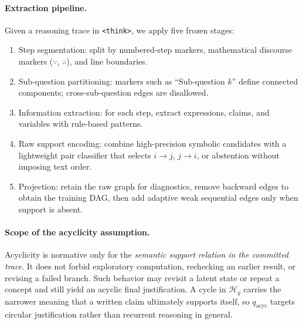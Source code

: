 \paragraph{Extraction pipeline.}
Given a reasoning trace in \texttt{<think>}, we apply five frozen stages:
\begin{enumerate}[leftmargin=*,itemsep=1pt]
    \item Step segmentation: split by numbered-step markers, mathematical discourse markers ($\because$, $\therefore$), and line boundaries.
    \item Sub-question partitioning: markers such as ``Sub-question $k$'' define connected components; cross-sub-question edges are disallowed.
    \item Information extraction: for each step, extract expressions, claims, and variables with rule-based patterns.
    \item Raw support encoding: combine high-precision symbolic candidates with a lightweight pair classifier that selects $i\!\to\!j$, $j\!\to\!i$, or abstention without imposing text order.
    \item Projection: retain the raw graph for diagnostics, remove backward edges to obtain the training DAG, then add adaptive weak sequential edges only when support is absent.
\end{enumerate}

\paragraph{Scope of the acyclicity assumption.}
\label{app:acyclicity_scope}
Acyclicity is normative only for the \emph{semantic support relation in the committed trace}. It does not forbid exploratory computation, rechecking an earlier result, or revising a failed branch. Such behavior may revisit a latent state or repeat a concept and still yield an acyclic final justification. A cycle in $\mathcal{H}_y$ carries the narrower meaning that a written claim ultimately supports itself, so $q_{\mathrm{acyc}}$ targets circular justification rather than recurrent reasoning in general.

